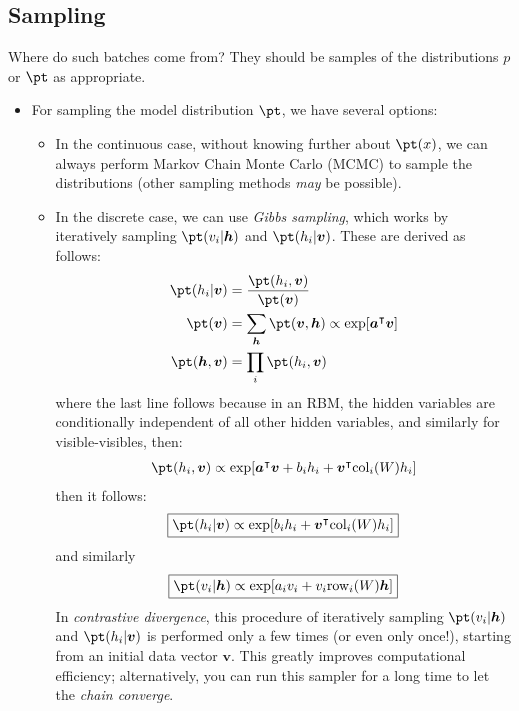 \documentclass[11pt]{article}
\newcommand{\vbf}{\boldsymbol{v}}
\newcommand{\hbf}{\boldsymbol{h}}
\newcommand{\abf}{\boldsymbol{a}}
\begin{document}
\subsection{Sampling}



Where do such batches come from? They should be samples of the distributions $p$ or $\pt$ as appropriate.
\begin{itemize}
\item For sampling the model distribution $\pt$, we have several options:
\begin{itemize}
\item In the continuous case, without knowing further about $\pt(x)$, we can always perform Markov Chain Monte Carlo (MCMC) to sample the distributions (other sampling methods \textit{may} be possible).
\item In the discrete case, we can use \textit{Gibbs sampling}, which works by iteratively sampling $\pt(v_i | \hbf)$ and $\pt(h_i | \vbf)$. These are derived as follows:
\begin{equation}
\begin{split}
\pt(h_i | \vbf) &= \frac{\pt(h_i, \vbf)}{\pt(\vbf)} \\
\pt(\vbf) &= \sum_{\hbf} \pt(\vbf,\hbf) \propto \exp [ \abf^\intercal \vbf ] \\
\pt(\hbf, \vbf) &= \prod_i \pt(h_i, \vbf)
\end{split}
\end{equation}
where the last line follows because in an RBM, the hidden variables are conditionally independent of all other hidden variables, and similarly for visible-visibles, then:
\begin{equation}
\begin{split}
\pt(h_i, \vbf) \propto \exp [ \abf^\intercal \vbf + b_i h_i + \vbf^\intercal \text{col}_i(W) h_i ]
\end{split}
\end{equation}
then it follows:
\begin{equation}
\boxed{
\pt(h_i | \vbf) \propto \exp [ b_i h_i + \vbf^\intercal \text{col}_i(W) h_i ]
}
\end{equation}
and similarly
\begin{equation}
\boxed{
\pt(v_i | \hbf) \propto \exp [ a_i v_i + v_i \text{row}_i(W) \hbf ]
}
\end{equation}
In \textit{contrastive divergence}, this procedure of iteratively sampling $\pt(v_i | \hbf)$ and $\pt(h_i | \vbf)$ is performed only a few times (or even only once!), starting from an initial data vector $\vbf$. This greatly improves computational efficiency; alternatively, you can run this sampler for a long time to let the \textit{chain converge}.


\end{itemize}
\end{itemize}
\end{document}
